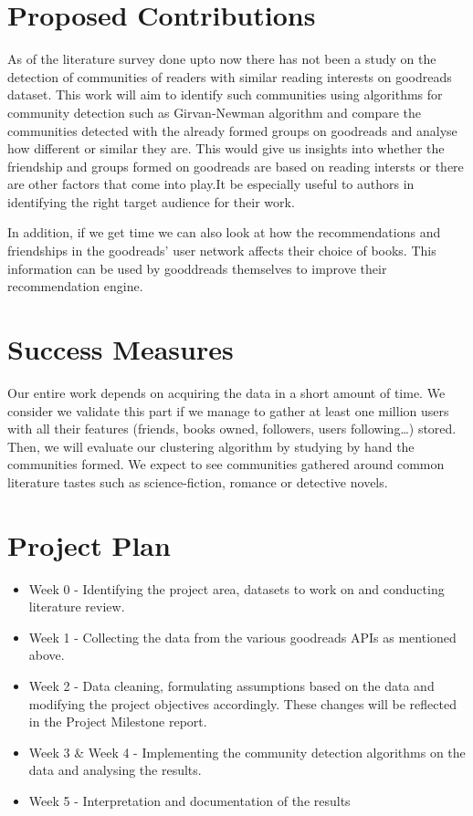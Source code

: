 \documentclass[12pt]{article}
\begin{document}


\section{Proposed Contributions}
As of the literature survey done upto now there has not been a study on the detection of communities of readers with similar reading interests on goodreads dataset. This work will aim to identify such communities using algorithms for community detection such as Girvan-Newman algorithm and compare the communities detected with the already formed groups on goodreads and analyse how different or similar they are. This would give us insights into whether the friendship and groups formed on goodreads are based on reading intersts or there are other factors that come into play.It be especially useful to authors in identifying the right target audience for their work.

In addition, if we get time we can also look at how the recommendations and friendships in the goodreads' user network affects their choice of books. This information can be used by gooddreads themselves to improve their recommendation engine.

\section{Success Measures}

Our entire work depends on acquiring the data in a short amount of time. We consider we validate this part if we manage to gather at least one million users with all their features (friends, books owned, followers, users following\dots) stored.\\
Then, we will evaluate our clustering algorithm by studying by hand the communities formed. We expect to see communities gathered around common literature tastes such as science-fiction, romance or detective novels. 


\section{Project Plan}
\begin{itemize}
\item Week 0 - Identifying the project area, datasets to work on and conducting literature review.
\item Week 1 -  Collecting the data from the various goodreads APIs as mentioned above.
\item Week 2 -  Data cleaning, formulating assumptions based on the data and modifying the project objectives accordingly. These changes will be reflected in the Project Milestone report.
\item Week 3 \& Week 4 - Implementing the community detection algorithms on the data and analysing the results.
\item Week 5 - Interpretation and documentation of the results
\end{itemize}
\end{document}
